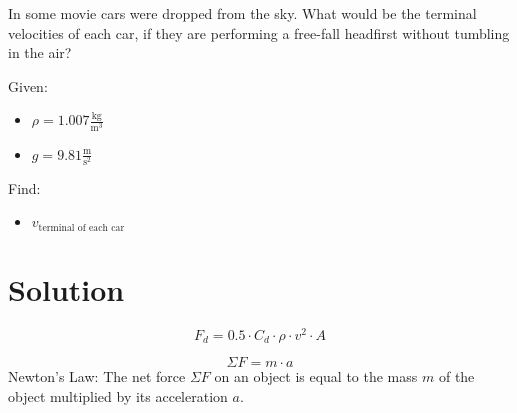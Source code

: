 
In some movie cars were dropped from the sky.
What would be the terminal velocities of each car, if they are
performing a free-fall headfirst without tumbling in the air?

\bigbreak Given:
\begin{itemize}
    \item $ \rho = 1.007 \frac{\text{kg}}{\text{m}^3} $
    \item $ g = 9.81 \frac{\text{m}}{\text{s}^2} $
\end{itemize}

Find:
\begin{itemize}
    \item $ v_{\text{terminal of each car}} $
\end{itemize}


\section*{Solution}

$$F_d = 0.5 \cdot C_d \cdot \rho \cdot v^2 \cdot A$$

$$ \Sigma F = m \cdot a $$
 Newton's Law: The net force $\Sigma F$ on an object is equal to the mass $m$ of the object multiplied by its acceleration $a$.


